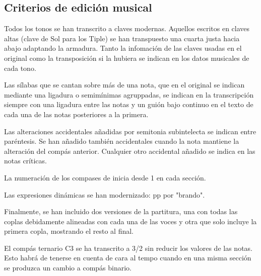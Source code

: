 \subsection*{Criterios de edición musical}
\noindent Todos los tonos se han transcrito a claves modernas. Aquellos escritos en claves altas (clave de Sol para los Tiple) se han transpuesto una cuarta justa hacia abajo adaptando la armadura. Tanto la infomación de las claves usadas en el original como la transposición si la hubiera se indican en los datos musicales de cada tono.

\noindent Las sílabas que se cantan sobre más de una nota, que en el original se indican mediante una ligadura o semimínimas agruppadas, se indican en la transcripción siempre con una ligadura entre las notas y un guión bajo continuo en el texto de cada una de las notas posteriores a la primera. 

\noindent Las alteraciones accidentales añadidas por semitonia subintelecta se indican entre paréntesis. Se han añadido también accidentales cuando la nota mantiene la alteración del compás anterior. Cualquier otro accidental añadido se indica en las notas críticas.

\noindent La numeración de los compases de inicia desde 1 en cada sección.

\noindent Las expresiones dinámicas se han modernizado: pp por "brando".


Finalmente, se han incluido dos versiones de la partitura, una con todas las coplas debidamente alineadas con cada una de las voces y otra que solo incluye la primera copla, mostrando el resto al final.



\noindent El compás ternario C3 se ha transcrito a 3/2 sin reducir los valores de las notas. Esto habrá de tenerse en cuenta de cara al tempo cuando en una misma sección se produzca un cambio a compás binario.


